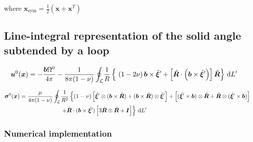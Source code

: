where $\bm x_{\text{sym}}=\frac{1}{2}(\bm x+\bm x^T)$

\subsection{Line-integral representation of the solid angle subtended by a loop}

\begin{align}
 \bm u^0(\bm x)=-\frac{\bm b\Omega^0}{4\pi}-\frac{1}{8\pi(1-\nu)}\oint_\mathcal{L}&\frac{1}{R}\left\{\ 
 \left(1-2\nu\right) \bm b\times\hat{\bm \xi}'
+ \left[\hat{\bm R}\cdot\left(\bm b\times\hat{\bm \xi}' \right) \right]\hat{\bm R}  \right\}\dL'
\end{align}


\begin{align}
\bm\sigma^0(\bm x)=\frac{\mu}{4\pi(1-\nu)}\oint_{\mathcal{L}}&\frac{1}{R^2}\left\{
(1-\nu)\left[\hat{\bm\xi}'\otimes(\bm b\times\hat{\bm R})+(\bm b\times\hat{\bm R})\otimes\hat{\bm\xi}'\right] 
+\left[(\hat{\bm \xi}'\times\bm b)\otimes\hat{\bm R}+\hat{\bm R}\otimes(\hat{\bm \xi}'\times\bm b)\right] \right. \nonumber\\
&\left.+\hat{\bm R}\cdot(\bm b\times\hat{\bm\xi}')\left[3\hat{\bm R}\otimes\hat{\bm R}+\bm I \right]
\right\}\,\text{d}L'
\end{align}


\subsubsection{Numerical implementation}

